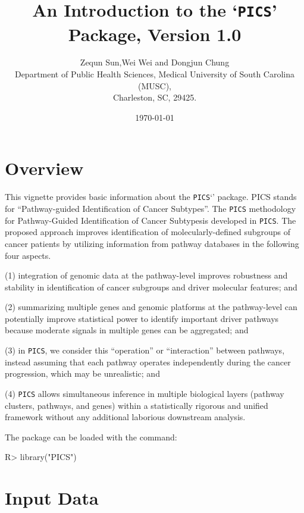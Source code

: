 \documentclass[11pt]{article}
\title{An Introduction to the `\texttt{PICS}' Package, Version 1.0}
\author{ Zequn Sun,Wei Wei and Dongjun Chung\\
Department of Public Health Sciences, Medical University of South Carolina (MUSC),\\
  Charleston, SC, 29425.}
\date{\today}
\begin{document}

\maketitle

\section{Overview}

This vignette provides basic information about the
\texttt{PICS}`\cite{PICS}' package. PICS stands for ``Pathway-guided Identification of Cancer Subtypes''.
The \texttt{PICS} methodology for Pathway-Guided Identification of Cancer Subtypesis developed in \texttt{PICS}. The proposed approach improves identification of molecularly-defined subgroups of cancer patients by utilizing information from pathway databases in the following four aspects.

(1) integration of genomic data at the pathway-level improves robustness and stability in identification of cancer subgroups and driver molecular features; and

(2) summarizing multiple genes and genomic platforms at the pathway-level can potentially improve statistical power to identify important driver pathways because moderate signals in multiple genes can be aggregated; and

(3) in \texttt{PICS}, we consider this ``operation'' or ``interaction'' between pathways, instead assuming that each pathway operates independently during the cancer progression, which may be unrealistic; and

(4) \texttt{PICS} allows simultaneous inference in multiple biological layers (pathway clusters, pathways, and genes) within a statistically rigorous and unified framework without any additional laborious downstream analysis.

The package can be loaded with the command:


\begin{Schunk}
\begin{Sinput}
R> library("PICS")
\end{Sinput}
\end{Schunk}

\section{Input Data}
\end{document}
